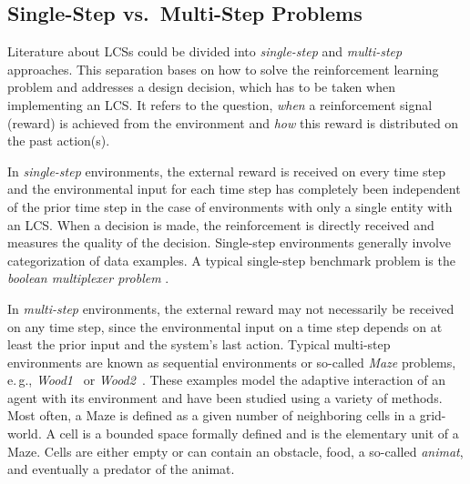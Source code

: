 
\subsection{Single-Step vs.\ Multi-Step Problems}
\label{subsection:single-step-vs-multi-step-problems}

Literature about LCSs could be divided into \emph{single-step} and \emph{mul\-ti-step} approaches. This separation bases on how to solve the reinforcement learning problem and addresses a design decision, which has to be taken when implementing an LCS. It refers to the question, \emph{when} a reinforcement signal (reward) is achieved from the environment and \emph{how} this reward is distributed on the past action(s). 

In \emph{single-step} environments, the external reward is received on every time step and the environmental input for each time step has completely been independent of the prior time step in the case of environments with only a single entity with an LCS. When a decision is made, the reinforcement is directly received and measures the quality of the decision. Single-step environments generally involve categorization of data examples. A typical single-step benchmark problem is the \emph{boolean multiplexer problem} \cite{BKLW04,Wil95}. 

In \emph{multi-step} environments, the external reward may not necessarily be received on any time step, since the environmental input on a time step depends on at least the prior input and the system's last action. Typical multi-step environments are known as sequential environments or so-called \emph{Maze} problems, e.\,g., \emph{Wood1}~\cite{Wil94} or \emph{Wood2}~\cite{Wil95}. These examples model the adaptive interaction of an agent with its environment and have been studied using a variety of methods. Most often, a Maze is defined as a given number of neighboring cells in a grid-world. A cell is a bounded space formally defined and is the elementary unit of a Maze. Cells are either empty or can contain an obstacle, food, a so-called \emph{animat}, and eventually a predator of the animat. 

